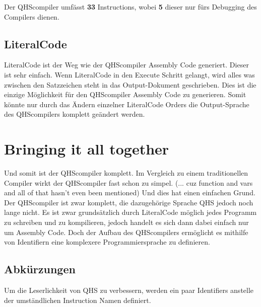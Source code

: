 Der QHScompiler umfässt \textbf{33} Instructions, wobei \textbf{5} dieser nur fürs Debugging des Compilers dienen.

\subsection{LiteralCode}
LiteralCode ist der Weg wie der QHScompiler Assembly Code generiert. Dieser ist sehr einfach. Wenn LiteralCode in den Execute Schritt gelangt, wird alles was zwischen den Satzzeichen steht in das Output-Dokument geschrieben.
Dies ist die einzige Möglichkeit für den QHScompiler Assembly Code zu generieren. Somit könnte nur durch das Ändern einzelner LiteralCode Orders die Output-Sprache des QHScompilers komplett geändert werden.


\section{Bringing it all together} \label{sec:qhs-bringing-it-together}
Und somit ist der QHScompiler komplett. Im Vergleich zu einem traditionellen Compiler wirkt der QHScompiler fast schon zu simpel. (... cuz function and vars and all of that hasn't even been mentioned) 
Und dies hat einen einfachen Grund. Der QHScompiler ist zwar komplett,
die dazugehörige Sprache QHS jedoch noch lange nicht. Es ist zwar grundsätzlich durch LiteralCode möglich jedes Programm zu schreiben und zu kompilieren, jedoch handelt es sich dann dabei einfach nur um Assembly Code.
Doch der Aufbau des QHScompilers ermöglicht es mithilfe von Identifiern eine komplexere Programmiersprache zu definieren.

\subsection{Abkürzungen}
Um die Leserlichkeit von QHS zu verbessern, werden ein paar Identifiers anstelle der umständlichen Instruction Namen definiert.

